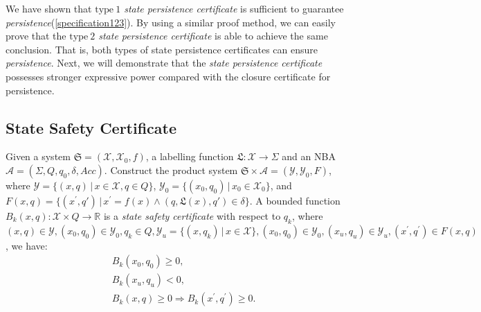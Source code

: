 We have shown that \emph{$\mathrm{type~1}$ state persistence certificate} is sufficient to guarantee \emph{persistence}(\ref{specification123}). By using a similar proof method, we can easily prove that the \emph{$\mathrm{type~2}$ state persistence certificate} is able to achieve the same conclusion. That is, both types of state persistence certificates can ensure \emph{persistence}. Next, we will demonstrate that the \emph{state persistence certificate} possesses stronger expressive power compared with the closure certificate for persistence.

\subsection{State Safety Certificate}

\begin{definition}
  \label{state-safety-certificate-definition}
  Given a system $\mathfrak{S} = (\mathcal{X}, \mathcal{X}_0, f)$, a labelling function $\mathfrak{L}:\mathcal{X} \rightarrow \Sigma$ and an NBA $\mathcal{A}=(\Sigma, Q, q_0, \delta, Acc)$. Construct the product system $\mathfrak{S} \times \mathcal{A} = (\mathcal{Y}, \mathcal{Y}_0, F)$, where $\mathcal{Y} = \{(x, q) \,|\, x \in \mathcal{X}, q \in Q \}$, $\mathcal{Y}_0 = \{ (x_0, q_0) \,|\, x_0 \in \mathcal{X}_0 \}$, and $F(x,q) = \{(x^{\prime}, q') \,|\, x^{\prime} = f(x) \land (q, \mathfrak{L}(x), q') \in \delta\}$. A bounded function $B_{k}(x, q): \mathcal{X} \times Q \rightarrow \mathbb{R}$ is a \emph{state safety certificate} with respect to $q_k$, where $(x,q) \in \mathcal{Y}, (x_0, q_0) \in \mathcal{Y}_0, q_k \in Q, \mathcal{Y}_u = \{(x, q_k) \,|\, x \in \mathcal{X}\}, (x_0, q_0) \in \mathcal{Y}_0, (x_u, q_u) \in \mathcal{Y}_u, (x^{\prime}, q^{\prime}) \in F(x, q)$, we have:
  \begin{align}
    &B_{k}(x_0, q_0) \geq 0, \label{bsinn1} \\ %
    &B_{k}(x_u, q_u) < 0, \label{bsun1} \\ %
    &B_{k}(x, q) \geq 0 \Rightarrow B_{k}(x^{\prime}, q^{\prime}) \geq 0. \label{bstnn1} %
  \end{align}
\end{definition}

